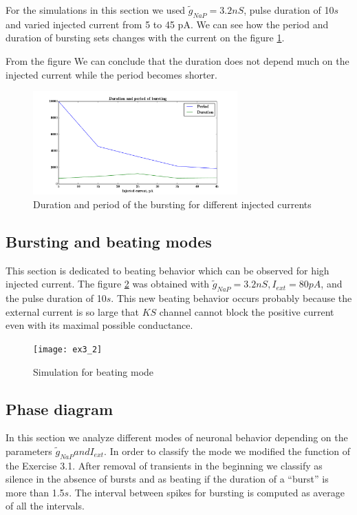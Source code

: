 \documentclass[a4paper,11pt]{article} %
\begin{document}
For the simulations in this section we used $\tilde{g}_{NaP} = 3.2nS$, pulse
duration of 10$s$ and varied injected current from 5 to 45 pA.
We can see how the period and duration of bursting sets changes with 
the current on the figure \ref{fig:bdur_bper}.

From the figure We can conclude that the duration does not depend much on the
injected current while the period becomes shorter.

\begin{figure}[H]
    \centering
    \includegraphics[width=0.7\textwidth]{bduration_bperiod}
    \caption{Duration and period of the bursting for different injected currents}
    \label{fig:bdur_bper}
\end{figure}

\subsection{Bursting and beating modes}

This section is dedicated to beating behavior which
can be observed for high injected current. The figure \ref{fig:beat} was obtained
with $\tilde{g}_{NaP} = 3.2nS, I_{ext} = 80pA$, and the pulse duration of 10$s$.
This new beating behavior occurs probably because the external current is so
large that $KS$ channel cannot block the positive current even with
its maximal possible conductance. 

\begin{figure}[H]
    \centering
    \texttt{[image: ex3\_2]}
    \caption{Simulation for beating mode}
    \label{fig:beat}
\end{figure}


\subsection{Phase diagram}

In this section we analyze different modes of neuronal behavior
depending on the parameters  $\tilde{g}_{NaP} and I_{ext}$.
In order to classify the mode we modified the function of the Exercise 3.1.
After removal of transients in the beginning we classify as silence in
the absence of bursts and as beating if the duration of a ``burst'' is more than 1.5$s$.
The interval between spikes for bursting is computed as average of all the intervals.
\end{document}
